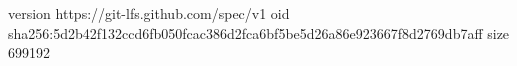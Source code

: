 version https://git-lfs.github.com/spec/v1
oid sha256:5d2b42f132ccd6fb050fcac386d2fca6bf5be5d26a86e923667f8d2769db7aff
size 699192
